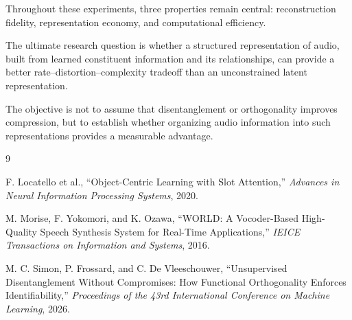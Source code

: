 \documentclass{article}
\begin{document}
Throughout these experiments, three properties
remain central: reconstruction fidelity,
representation economy, and computational efficiency.

The ultimate research question is whether a
structured representation of audio, built from
learned constituent information and its relationships,
can provide a better rate--distortion--complexity
tradeoff than an unconstrained latent representation.

The objective is not to assume that disentanglement
or orthogonality improves compression, but to
establish whether organizing audio information
into such representations provides a measurable
advantage.

\begin{thebibliography}{9}

F. Locatello et al.,
``Object-Centric Learning with Slot Attention,''
\emph{Advances in Neural Information Processing Systems},
2020.

M. Morise, F. Yokomori, and K. Ozawa,
``WORLD: A Vocoder-Based High-Quality Speech Synthesis
System for Real-Time Applications,''
\emph{IEICE Transactions on Information and Systems},
2016.

M. C. Simon, P. Frossard, and C. De Vleeschouwer,
``Unsupervised Disentanglement Without Compromises:
How Functional Orthogonality Enforces Identifiability,''
\emph{Proceedings of the 43rd International Conference
on Machine Learning}, 2026.

\end{thebibliography}
\end{document}
